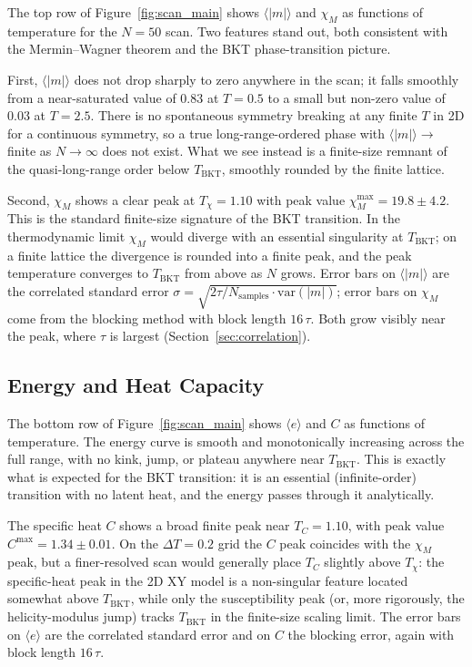 \documentclass[11pt,a4paper]{article}
\begin{document}
The top row of Figure~\ref{fig:scan_main} shows $\langle |m| \rangle$ and $\chi_M$ as functions of temperature for the $N = 50$ scan. Two features stand out, both consistent with the Mermin--Wagner theorem and the BKT phase-transition picture.

First, $\langle |m| \rangle$ does not drop sharply to zero anywhere in the scan; it falls smoothly from a near-saturated value of $0.83$ at $T = 0.5$ to a small but non-zero value of $0.03$ at $T = 2.5$. There is no spontaneous symmetry breaking at any finite $T$ in 2D for a continuous symmetry, so a true long-range-ordered phase with $\langle |m|
\rangle \to $ finite as $N \to \infty$ does not exist. What we see instead
is a finite-size remnant of the quasi-long-range order below $T_{\mathrm{BKT}}$, smoothly rounded by the finite lattice.

Second, $\chi_M$ shows a clear peak at $T_\chi = 1.10$ with peak value $\chi_M^{\max} = 19.8 \pm 4.2$. This is the standard finite-size signature of the BKT transition. In the thermodynamic limit $\chi_M$ would diverge with an essential singularity at $T_{\mathrm{BKT}}$; on a finite lattice the divergence is rounded into a finite peak, and the peak temperature converges to $T_{\mathrm{BKT}}$ from above as $N$ grows. Error bars on $\langle |m| \rangle$ are the correlated standard error $\sigma = \sqrt{2 \tau / N_{\mathrm{samples}}
\cdot \mathrm{var}(|m|)}$; error bars on $\chi_M$ come from the blocking
method with block length $16\,\tau$. Both grow visibly near the peak, where $\tau$ is largest (Section~\ref{sec:correlation}).

\subsection{Energy and Heat Capacity}
\label{sec:energy}

The bottom row of Figure~\ref{fig:scan_main} shows $\langle e \rangle$ and $C$ as functions of temperature. The energy curve is smooth and monotonically increasing across the full range, with no kink, jump, or plateau anywhere near $T_{\mathrm{BKT}}$. This is exactly what is expected for the BKT transition: it is an essential (infinite-order) transition with no latent heat, and the energy passes through it analytically.

The specific heat $C$ shows a broad finite peak near $T_C = 1.10$, with peak value $C^{\max} = 1.34 \pm 0.01$. On the $\Delta T = 0.2$ grid the $C$ peak coincides with the $\chi_M$ peak, but a finer-resolved scan would generally place $T_C$ slightly above $T_\chi$: the specific-heat peak in the 2D XY model is a non-singular feature located somewhat above $T_{\mathrm{BKT}}$, while only the susceptibility peak (or, more rigorously, the helicity-modulus jump) tracks $T_{\mathrm{BKT}}$ in the finite-size scaling limit. The error bars on $\langle e \rangle$ are the correlated standard error and on $C$ the blocking error, again with block length $16\,\tau$.
\end{document}
